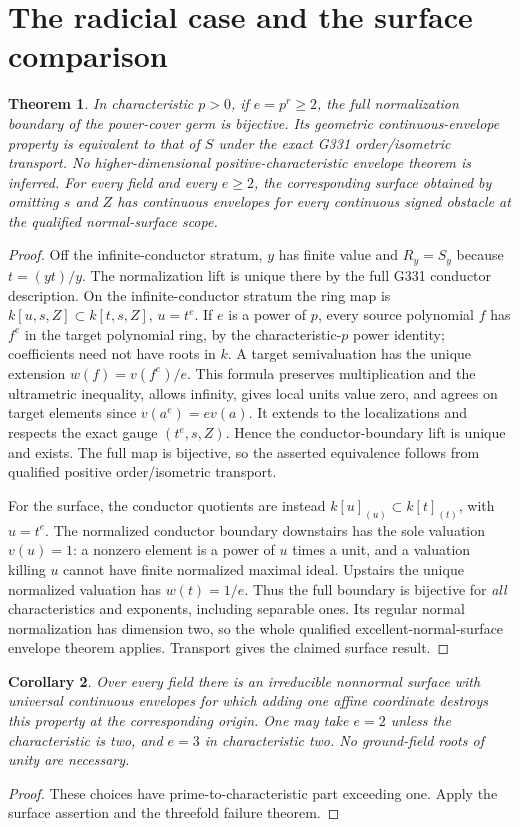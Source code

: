 \documentclass[11pt]{article}
\newtheorem{theorem}{Theorem}
\newtheorem{corollary}[theorem]{Corollary}
\begin{document}
\section{The radicial case and the surface comparison}
\begin{theorem}\label{th:dichotomy}
In characteristic $p>0$, if $e=p^r\ge2$, the full normalization
boundary of the power-cover germ is bijective. Its geometric
continuous-envelope property is equivalent to that of $S$ under
the exact G331 order/isometric transport. No higher-dimensional
positive-characteristic envelope theorem is inferred.
For \emph{every} field and \emph{every} $e\ge2$, the corresponding
surface obtained by omitting $s$ and $Z$ has continuous envelopes
for every continuous signed obstacle at the qualified normal-surface scope.
\end{theorem}
\begin{proof}
Off the infinite-conductor stratum, $y$ has finite value and
$R_y=S_y$ because $t=(yt)/y$. The normalization lift is unique
there by the full G331 conductor description.
On the infinite-conductor stratum the ring map is
$k[u,s,Z]\subset k[t,s,Z]$, $u=t^e$.
If $e$ is a power of $p$, every source polynomial $f$ has
$f^e$ in the target polynomial ring, by the characteristic-$p$
power identity; coefficients need not have roots in $k$.
A target semivaluation has the unique extension
$w(f)=v(f^e)/e$. This formula preserves multiplication and
the ultrametric inequality, allows infinity, gives local units
value zero, and agrees on target elements since $v(a^e)=ev(a)$.
It extends to the localizations and respects the exact gauge
$(t^e,s,Z)$. Hence the conductor-boundary lift is unique and exists.
The full map is bijective, so the asserted equivalence follows
from qualified positive order/isometric transport.

For the surface, the conductor quotients are instead
$k[u]_{(u)}\subset k[t]_{(t)}$, with $u=t^e$.
The normalized conductor boundary downstairs has the sole valuation
$v(u)=1$: a nonzero element is a power of $u$ times a unit,
and a valuation killing $u$ cannot have finite normalized maximal
ideal. Upstairs the unique normalized valuation has $w(t)=1/e$.
Thus the full boundary is bijective for \emph{all} characteristics
and exponents, including separable ones. Its regular normal
normalization has dimension two, so the whole qualified
excellent-normal-surface envelope theorem applies. Transport gives
the claimed surface result.
\end{proof}

\begin{corollary}
Over every field there is an irreducible nonnormal surface with
universal continuous envelopes for which adding one affine coordinate
destroys this property at the corresponding origin.
One may take $e=2$ unless the characteristic is two, and $e=3$
in characteristic two. No ground-field roots of unity are necessary.
\end{corollary}
\begin{proof}
These choices have prime-to-characteristic part exceeding one.
Apply the surface assertion and the threefold failure theorem.
\end{proof}
\end{document}
